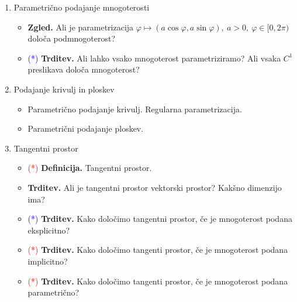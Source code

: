 \begin{enumerate}
    \item Parametrično podajanje mnogoterosti
    \begin{itemize}
        \item \textbf{Zgled.} Ali je parametrizacija $\varphi \mapsto (a \cos \varphi, a \sin \varphi), \ a > 0, \ \varphi \in [0, 2 \pi)$ določa podmnogoterost?
        \item \textcolor{blue}{(*)} \textbf{Trditev.} Ali lahko vsako mnogoterost parametriziramo? Ali vsaka \(C^1\) preslikava določa mnogoterost?
    \end{itemize}

    \item Podajanje krivulj in ploskev
    \begin{itemize}
        \item Parametrično podajanje krivulj. Regularna parametrizacija.
        \item Parametrični podajanje ploskev.
    \end{itemize}

    \item Tangentni prostor
    \begin{itemize}
        \item \textcolor{red}{(*)} \textbf{Definicija.} Tangentni prostor.
        \item \textbf{Trditev.} Ali je tangentni prostor vektorski prostor? Kakšno dimenzijo ima?
        \item \textcolor{blue}{(*)} \textbf{Trditev.} Kako določimo tangentni prostor, če je mnogoterost podana eksplicitno? 
        \item \textcolor{red}{(*)} \textbf{Trditev.} Kako določimo tangenti prostor, če je mnogoterost podana implicitno?
        \item \textcolor{red}{(*)} \textbf{Trditev.} Kako določimo tangenti prostor, če je mnogoterost podana parametrično?
    \end{itemize}
\end{enumerate}

